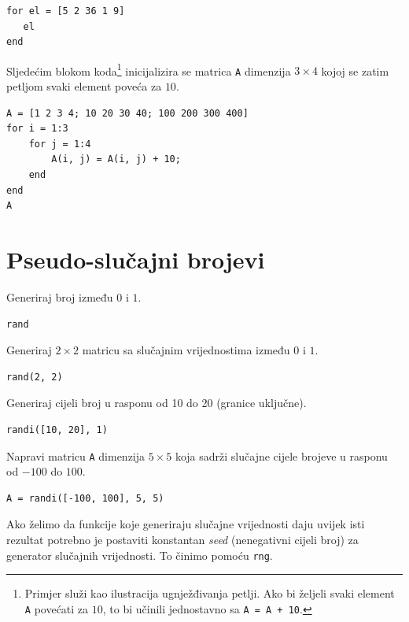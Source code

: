 \documentclass[a4paper, 10pt]{article}
\newcommand{\spec}[1]{\texttt{#1}} %
\newcommand{\eng}[1]{\emph{#1}} %
\begin{document}
\begin{lstlisting}
for el = [5 2 36 1 9]
   el
end
\end{lstlisting}

\pagebreak

Sljedećim blokom koda\footnote{Primjer služi kao ilustracija ugnježđivanja petlji.
Ako bi željeli svaki element \spec{A} povećati za $10$, to bi učinili jednostavno sa \spec{A = A + 10}.}
inicijalizira se matrica \spec{A} dimenzija $3 \times 4$ kojoj se zatim petljom svaki element poveća za $10$.

\begin{lstlisting}
A = [1 2 3 4; 10 20 30 40; 100 200 300 400]
for i = 1:3
    for j = 1:4
        A(i, j) = A(i, j) + 10;
    end
end
A
\end{lstlisting}


\section{Pseudo-slučajni brojevi}

Generiraj broj između $0$ i $1$.

\begin{lstlisting}
rand
\end{lstlisting}

Generiraj $2 \times 2$ matricu sa slučajnim vrijednostima između $0$ i $1$.

\begin{lstlisting}
rand(2, 2)
\end{lstlisting}

Generiraj cijeli broj u rasponu od 10 do 20 (granice uključne).

\begin{lstlisting}
randi([10, 20], 1)
\end{lstlisting}

Napravi matricu \spec{A} dimenzija $5 \times 5$ koja sadrži slučajne cijele brojeve u rasponu od $-100$ do $100$.

\begin{lstlisting}
A = randi([-100, 100], 5, 5)
\end{lstlisting}

Ako želimo da funkcije koje generiraju slučajne vrijednosti daju uvijek isti rezultat potrebno je postaviti konstantan \eng{seed} (nenegativni cijeli broj) za generator slučajnih vrijednosti.
To činimo pomoću \spec{rng}.
\end{document}
